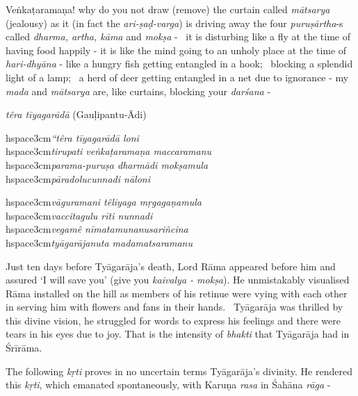 Veṅkaṭaramaṇa! why do you not draw (remove) the curtain called \textit{mātsarya} (jealousy) as it (in fact the \textit{ari-ṣaḍ-varga}) is driving away the four \textit{puruṣārtha}-s called \textit{dharma, artha, kāma} and \textit{mokṣa} -  it is disturbing like a fly at the time of having food happily - it is like the mind going to an unholy place at the time of \textit{hari-dhyāna} - like a hungry fish getting entangled in a hook;  blocking a splendid light of a lamp;  a herd of deer getting entangled in a net due to ignorance - my \textit{mada} and \textit{mātsarya} are, like curtains, blocking your \textit{darśana} -  

\textit{têra tīyagarādā} (Gauḷipantu-Ādi)

\begin{myquote}
hspace{3cm}\textit{“têra tīyagarādā loni}\\hspace{3cm}\textit{tirupati veṅkaṭaramaṇa maccaramanu}\\hspace{3cm}\textit{parama-puruṣa dharmādi mokṣamula}\\hspace{3cm}\textit{pāradolucunnadi nāloni}
\end{myquote}

\begin{myquote}
hspace{3cm}\textit{vāguramani têliyaga mṛgagaṇamula}\\hspace{3cm}\textit{vaccitagulu rīti nunnadi}\\hspace{3cm}\textit{vegamê nīmatamunanusariñcina}\\hspace{3cm}\textit{tyāgarājanuta madamatsaramanu}
\end{myquote}

Just ten days before Tyāgarāja’s death, Lord Rāma appeared before him and assured ‘I will save you’ (give you \textit{kaivalya - mokṣa}). He unmistakably visualised Rāma installed on the hill as members of his retinue were vying with each other in serving him with flowers and fans in their hands.  Tyāgarāja was thrilled by this divine vision, he struggled for words to express his feelings and there were tears in his eyes due to joy. That is the intensity of \textit{bhakti} that Tyāgarāja had in Śrīrāma.

The following \textit{kṛti} proves in no uncertain terms Tyāgarāja’s divinity. He rendered this \textit{kṛti}, which emanated spontaneously, with Karuṇa \textit{rasa} in Śahāna \textit{rāga} - 

